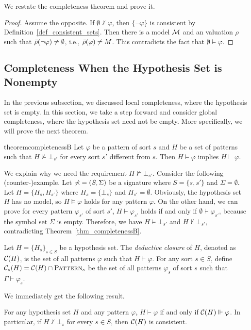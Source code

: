 \documentclass{amsart}
\begin{document}
We restate the completeness theorem and prove it.

\completenessA*

\begin{proof}
Assume the opposite.
If $\emptyset \not\vdash \varphi$, 
then $\{ \neg \varphi \}$ is consistent by 
Definition~\ref{def_consistent_sets}.
Then there is a model $\mathcal{M}$ and an valuation $\rho$ such that
$\bar{\rho}(\neg \varphi) \neq \emptyset$, i.e., 
$\bar{\rho}(\varphi) \neq M$.
This contradicts the fact that $\emptyset \vDash \varphi$.
\end{proof}

\subsection{Completeness When the Hypothesis Set is Nonempty}

In the previous subsection, we discussed local completeness,
where the hypothesis set is empty.
In this section, we take a step forward and consider global completeness,
where the hypothesis set need not be empty.
More specifically, we will prove the next theorem.
\begin{restatable}{theorem}{completenessB}
\label{thm_completenessB}
Let $\varphi$ be a pattern of sort $s$ and $H$ 
be a set of patterns
such that $H \not\vDash \bot_{s'}$ for every sort $s'$ different from $s$.  
Then $H \vDash \varphi$ implies $H \vdash \varphi$.
\end{restatable}

We explain why we need the requirement
$H \not\vDash \bot_{s'}$.
Consider the following (counter-)example.
Let $\mathbb{\Sigma} = (S,\Sigma)$ be a signature
where $S = \{s,s'\}$ and $\Sigma = \emptyset$.
Let $H = \{ H_s , H_{s'} \}$ where
$H_s = \{ \bot_s \}$ and $H_{s'} = \emptyset$.
Obviously, the hypothesis set $H$ has no model,
so $H \vDash \varphi$ holds for any pattern $\varphi$.
On the other hand,
we can prove for every pattern $\varphi_{s'}$ of sort $s'$,
$H \vdash \varphi_{s'}$ holds if and only if
$\emptyset \vdash \varphi_{s'}$,
because the symbol set $\Sigma$ is empty.
Therefore, we have
$H \vDash \bot_{s'}$ and $H \not\vdash \bot_{s'}$,
contradicting Theorem~\ref{thm_completenessB}.


\begin{definition}
\label{def_deductive_closure}
Let $H = \{ H_s \}_{s \in S}$ be a hypothesis set.
The \emph{deductive closure} of $H$,
denoted as $\mathcal{C}(H)$,
is the set of all patterns $\varphi$ such that
$H \vdash \varphi$. 
For any sort $s \in S$,
define $\mathcal{C}_s(H) = \mathcal{C}(H) \cap \textnormal{\textsc{Pattern}}_s$
be the set of all patterns $\varphi_s$ of sort $s$ such that
$\Gamma \vdash \varphi_s$.
\end{definition}
We immediately get the following result.
\begin{proposition}
For any hypothesis set $H$ and any pattern $\varphi$, 
$H \vdash \varphi$ if and only if 
$\mathcal{C}(H) \Vdash \varphi$.
In particular, if $H \not\vdash \bot_s$ for every $s \in S$,
then $\mathcal{C}(H)$ is consistent.
\end{proposition}
\end{document}
